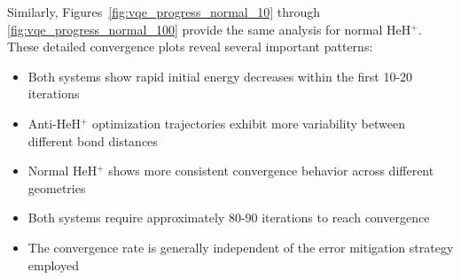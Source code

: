 \documentclass[10pt,twocolumn,a4paper]{article}
\begin{document}
Similarly, Figures~\ref{fig:vqe_progress_normal_10} through \ref{fig:vqe_progress_normal_100} provide the same analysis for normal HeH$^+$. These detailed convergence plots reveal several important patterns:

\begin{itemize}
    \item Both systems show rapid initial energy decreases within the first 10-20 iterations
    \item Anti-HeH$^+$ optimization trajectories exhibit more variability between different bond distances
    \item Normal HeH$^+$ shows more consistent convergence behavior across different geometries
    \item Both systems require approximately 80-90 iterations to reach convergence
    \item The convergence rate is generally independent of the error mitigation strategy employed
\end{itemize}
\end{document}
